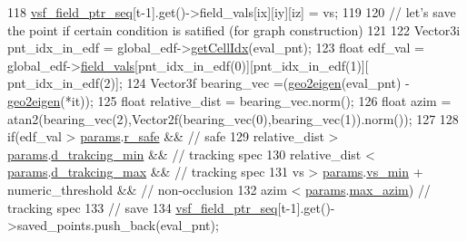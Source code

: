 \begin{DoxyCode}
118                     \hyperlink{class_preplanner_aab0f91e34b86eaa581c7642ba5059308}{vsf\_field\_ptr\_seq}[t-1].get()->field\_vals[ix][iy][iz] = vs;
119 
120                     \textcolor{comment}{// let's save the point if certain condition is satified (for graph construction)      
                }
121                     
122                     Vector3i pnt\_idx\_in\_edf = global\_edf->\hyperlink{struct_grid_field_a1a70c2de6239c1b086d01dc89b161b7c}{getCellIdx}(eval\_pnt);
123                     \textcolor{keywordtype}{float} edf\_val = global\_edf->\hyperlink{struct_grid_field_a46802a85d9533d4371d12597f0247c7d}{field\_vals}[pnt\_idx\_in\_edf(0)][pnt\_idx\_in\_edf(1)][
      pnt\_idx\_in\_edf(2)];  
124                     Vector3f bearing\_vec =(\hyperlink{_common_8h_a3e35de4eb7396984c2c5018768885d91}{geo2eigen}(eval\_pnt) - 
      \hyperlink{_common_8h_a3e35de4eb7396984c2c5018768885d91}{geo2eigen}(*it)); 
125                     \textcolor{keywordtype}{float} relative\_dist = bearing\_vec.norm();                      
126                     \textcolor{keywordtype}{float} azim = atan2(bearing\_vec(2),Vector2f(bearing\_vec(0),bearing\_vec(1)).norm());
127                     
128                     \textcolor{keywordflow}{if}(edf\_val > \hyperlink{class_preplanner_a679cc4b70f041aff73769e7ec92dc5d0}{params}.\hyperlink{structchaser_1_1_preplanner_params_a409be3b01b1b4853919d5b34e529c49a}{r\_safe} && \textcolor{comment}{// safe }
129                         relative\_dist > \hyperlink{class_preplanner_a679cc4b70f041aff73769e7ec92dc5d0}{params}.\hyperlink{structchaser_1_1_preplanner_params_aeef51c9ac61b5fa70c853463a27ff879}{d\_trakcing\_min} && \textcolor{comment}{// tracking spec}
130                         relative\_dist < \hyperlink{class_preplanner_a679cc4b70f041aff73769e7ec92dc5d0}{params}.\hyperlink{structchaser_1_1_preplanner_params_ad6659842d3039da7b064532a090651d3}{d\_trakcing\_max} && \textcolor{comment}{// tracking spec}
131                         vs > \hyperlink{class_preplanner_a679cc4b70f041aff73769e7ec92dc5d0}{params}.\hyperlink{structchaser_1_1_preplanner_params_a2abe7915546a5d2ebde667a1d5ccfb44}{vs\_min} + numeric\_threshold  && \textcolor{comment}{// non-occlusion}
132                         azim < \hyperlink{class_preplanner_a679cc4b70f041aff73769e7ec92dc5d0}{params}.\hyperlink{structchaser_1_1_preplanner_params_ab357e30646928070cd553ccf14be0beb}{max\_azim})  \textcolor{comment}{// tracking spec }
133                         \textcolor{comment}{// save}
134                         \hyperlink{class_preplanner_aab0f91e34b86eaa581c7642ba5059308}{vsf\_field\_ptr\_seq}[t-1].get()->saved\_points.push\_back(eval\_pnt);

\end{DoxyCode}
